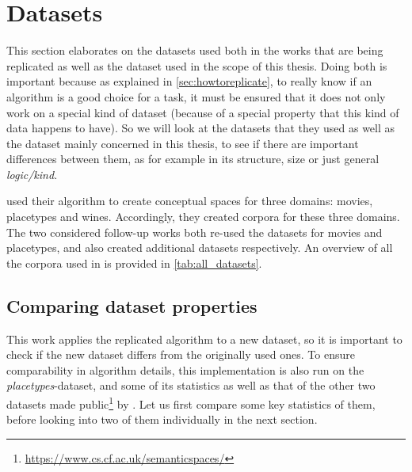 \section{Datasets}




This section elaborates on the datasets used both in the works that are being replicated as well as the dataset used in the scope of this thesis. Doing both is important because as explained in \autoref{sec:howtoreplicate}, to really know if an algorithm is a good choice for a task, it must be ensured that it does not only work on a special kind of dataset (because of a special property that this kind of data happens to have). So we will look at the datasets that they used as well as the dataset mainly concerned in this thesis, to see if there are important differences between them, as for example in its structure, size or just general \emph{logic/kind}.

\textcite{Derrac2015} used their algorithm to create conceptual spaces for three domains: movies, placetypes and wines. Accordingly, they created corpora for these three domains. The two considered follow-up works both re-used the datasets for movies and placetypes, and also created additional datasets respectively. An overview of all the corpora used in \mainalgos is provided in \autoref{tab:all_datasets}.


\subsection*{Comparing dataset properties}

This work applies the replicated algorithm to a new dataset, so it is important to check if the new dataset differs from the originally used ones. To ensure comparability in algorithm details, this implementation is also run on the \emph{placetypes}-dataset, and some of its statistics as well as that of the other two datasets made public\footnote{\url{https://www.cs.cf.ac.uk/semanticspaces/}} by \cite{Derrac2015}. Let us first compare some key statistics of them, before looking into two of them individually in the next section.

